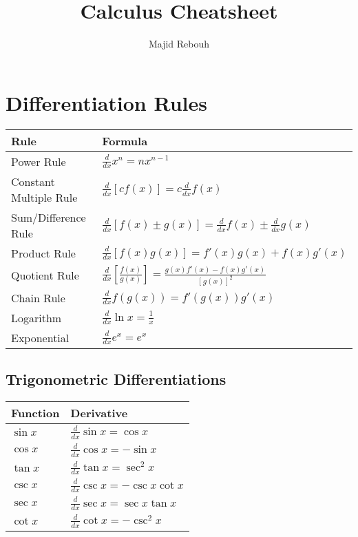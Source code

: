 \documentclass{article}
\title{\Huge\textbf{Calculus Cheatsheet}}
\author{\large Majid Rebouh}
\date{}
\begin{document}
\maketitle

\section*{\Large Differentiation Rules}

\begin{center}
\begin{tabular}{|l|l|}
    \hline
    \textbf{Rule} & \textbf{Formula} \\
    \hline
    Power Rule & $\frac{d}{dx}x^n = nx^{n-1}$ \\
    Constant Multiple Rule & $\frac{d}{dx}[cf(x)] = c\frac{d}{dx}f(x)$ \\
    Sum/Difference Rule & $\frac{d}{dx}[f(x) \pm g(x)] = \frac{d}{dx}f(x) \pm \frac{d}{dx}g(x)$ \\
    Product Rule & $\frac{d}{dx}[f(x)g(x)] = f'(x)g(x) + f(x)g'(x)$ \\
    Quotient Rule & $\frac{d}{dx}\left[\frac{f(x)}{g(x)}\right] = \frac{g(x)f'(x) - f(x)g'(x)}{[g(x)]^2}$ \\
    Chain Rule & $\frac{d}{dx}f(g(x)) = f'(g(x))g'(x)$ \\
    Logarithm & $\frac{d}{dx}\ln x = \frac{1}{x}$ \\
    Exponential & $\frac{d}{dx}e^x = e^x$ \\
    \hline
\end{tabular}
\end{center}

\vspace{2em}

\subsection*{\large Trigonometric Differentiations}

\begin{center}
\begin{tabular}{|l|l|}
    \hline
    \textbf{Function} & \textbf{Derivative} \\
    \hline
    $\sin x$ & $\frac{d}{dx}\sin x = \cos x$ \\
    $\cos x$ & $\frac{d}{dx}\cos x = -\sin x$ \\
    $\tan x$ & $\frac{d}{dx}\tan x = \sec^2 x$ \\
    $\csc x$ & $\frac{d}{dx}\csc x = -\csc x \cot x$ \\
    $\sec x$ & $\frac{d}{dx}\sec x = \sec x \tan x$ \\
    $\cot x$ & $\frac{d}{dx}\cot x = -\csc^2 x$ \\
    \hline
\end{tabular}
\end{center}
\end{document}

